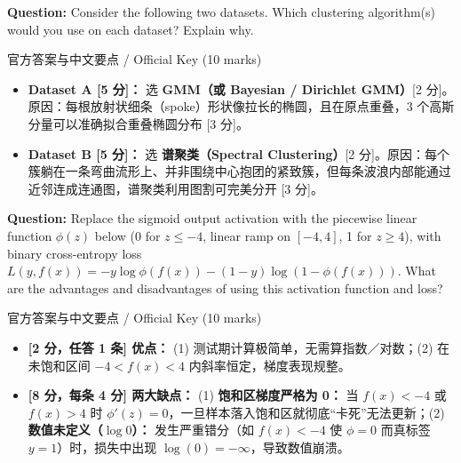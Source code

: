 \textbf{Question:} Consider the following two datasets. Which clustering algorithm(s) would you use on each dataset? Explain why.


\begin{StudySolution}{官方答案与中文要点 / Official Key (10 marks)}
\begin{itemize}
\item \textbf{Dataset A [5 分]：} 选 \textbf{GMM（或 Bayesian / Dirichlet GMM）}[2 分]。原因：每根放射状细条（spoke）形状像拉长的椭圆，且在原点重叠，3 个高斯分量可以准确拟合重叠椭圆分布 [3 分]。
\item \textbf{Dataset B [5 分]：} 选 \textbf{谱聚类（Spectral Clustering）}[2 分]。原因：每个簇躺在一条弯曲流形上、并非围绕中心抱团的紧致簇，但每条波浪内部能通过近邻连成连通图，谱聚类利用图割可完美分开 [3 分]。
\end{itemize}
\end{StudySolution}

\textbf{Question:} Replace the sigmoid output activation with the piecewise linear function $\phi(z)$ below (0 for $z\le -4$, linear ramp on $[-4,4]$, 1 for $z\ge 4$), with binary cross-entropy loss $L(y,f(x)) = -y\log\phi(f(x)) - (1-y)\log(1-\phi(f(x)))$. What are the advantages and disadvantages of using this activation function and loss?


\begin{StudySolution}{官方答案与中文要点 / Official Key (10 marks)}
\begin{itemize}
\item \textbf{[2 分，任答 1 条] 优点：} (1) 测试期计算极简单，无需算指数／对数；(2) 在未饱和区间 $-4 < f(x) < 4$ 内斜率恒定，梯度表现规整。
\item \textbf{[8 分，每条 4 分] 两大缺点：} (1) \textbf{饱和区梯度严格为 0：} 当 $f(x)<-4$ 或 $f(x)>4$ 时 $\phi'(z)=0$，一旦样本落入饱和区就彻底“卡死”无法更新；(2) \textbf{数值未定义（$\log 0$）：} 发生严重错分（如 $f(x)<-4$ 使 $\phi=0$ 而真标签 $y=1$）时，损失中出现 $\log(0)=-\infty$，导致数值崩溃。
\end{itemize}
\end{StudySolution}

